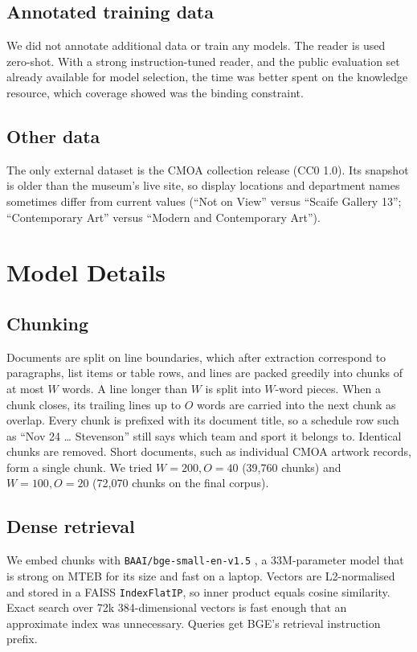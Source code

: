 \documentclass[11pt]{article}
\begin{document}
\subsection{Annotated training data}

We did not annotate additional data or train any models. The reader is used zero-shot. With a strong instruction-tuned reader, and the public evaluation set already available for model selection, the time was better spent on the knowledge resource, which coverage showed was the binding constraint.

\subsection{Other data}

The only external dataset is the CMOA collection release (CC0 1.0). Its snapshot is older than the museum's live site, so display locations and department names sometimes differ from current values (``Not on View'' versus ``Scaife Gallery 13''; ``Contemporary Art'' versus ``Modern and Contemporary Art'').

\section{Model Details}
\label{sec:model}

\subsection{Chunking}

Documents are split on line boundaries, which after extraction correspond to paragraphs, list items or table rows, and lines are packed greedily into chunks of at most $W$ words. A line longer than $W$ is split into $W$-word pieces. When a chunk closes, its trailing lines up to $O$ words are carried into the next chunk as overlap. Every chunk is prefixed with its document title, so a schedule row such as ``Nov 24 \ldots{} Stevenson'' still says which team and sport it belongs to. Identical chunks are removed. Short documents, such as individual CMOA artwork records, form a single chunk. We tried $W{=}200, O{=}40$ (39{,}760 chunks) and $W{=}100, O{=}20$ (72{,}070 chunks on the final corpus).

\subsection{Dense retrieval}

We embed chunks with \texttt{BAAI/bge-small-en-v1.5} \citep{xiao2023cpack}, a 33M-parameter model that is strong on MTEB for its size and fast on a laptop. Vectors are L2-normalised and stored in a FAISS \citep{johnson2019faiss} \texttt{IndexFlatIP}, so inner product equals cosine similarity. Exact search over 72k 384-dimensional vectors is fast enough that an approximate index was unnecessary. Queries get BGE's retrieval instruction prefix.
\end{document}
